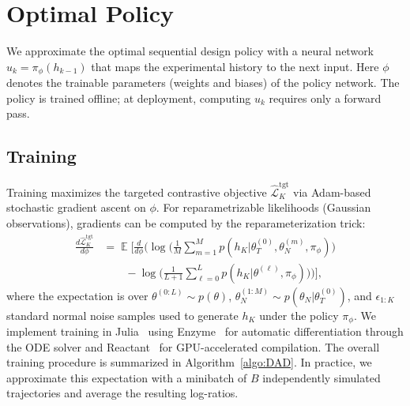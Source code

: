 \documentclass[conference]{IEEEtran}
\DeclareMathOperator{\E}{\mathbb{E}}
\begin{document}
\section{Optimal Policy}
We approximate the optimal sequential design policy with a neural network $u_k = \pi_\phi(h_{k-1})$ that maps the experimental history to the next input.
Here $\phi$ denotes the trainable parameters (weights and biases) of the policy network.
The policy is trained offline; at deployment, computing $u_k$ requires only a forward pass.

\subsection{Training}
Training maximizes the targeted contrastive objective $\hat{\mathcal{L}}_K^{\text{tgt}}$ via Adam-based stochastic gradient ascent on $\phi$. For reparametrizable likelihoods (Gaussian observations), gradients can be computed by the reparameterization trick:
\begin{equation}
\begin{aligned}
\frac{d\hat{\mathcal{L}}_K^{\text{tgt}}}{d\phi}
&= \E\Bigg[\frac{d}{d\phi}\Bigg(
\log\Big(\frac{1}{M}\sum_{m=1}^{M}
p(h_K|\theta_T^{(0)}, \theta_N^{(m)}, \pi_\phi)\Big)\\
&\qquad - \log\Big(\frac{1}{L+1}\sum_{\ell=0}^{L}
p(h_K|\theta^{(\ell)}, \pi_\phi)\Big)
\Bigg)\Bigg],
\end{aligned}
\end{equation}
where the expectation is over $\theta^{(0:L)} \sim p(\theta)$, $\theta_N^{(1:M)} \sim p(\theta_N|\theta_T^{(0)})$, and $\epsilon_{1:K}$ standard normal noise samples used to generate $h_K$ under the policy $\pi_\phi$. We implement training in Julia~\citep{bezanson2017julia} using Enzyme~\citep{moses2020enzyme} for automatic differentiation through the ODE solver and Reactant~\citep{reactant2025} for GPU-accelerated compilation. The overall training procedure is summarized in Algorithm~\ref{algo:DAD}.
In practice, we approximate this expectation with a minibatch of $B$ independently simulated trajectories and average the resulting log-ratios.
\end{document}
